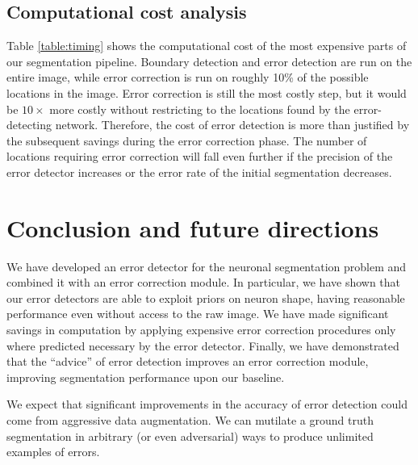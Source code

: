 \documentclass{article}
\begin{document}
\subsection{Computational cost analysis}
Table \ref{table:timing} shows the computational cost of the most expensive
parts of our segmentation pipeline. Boundary detection and error detection are
run on the entire image, while error correction is run on roughly 10\% of the
possible locations in the image.  Error correction is still the most costly
step, but it would be $10\times$ more costly without restricting to the
locations found by the error-detecting network. Therefore, the cost of error
detection is more than justified by the subsequent savings during the error
correction phase.  The number of locations requiring error correction will fall
even further if the precision of the error detector increases or the error rate
of the initial segmentation decreases.


\section{Conclusion and future directions}
We have developed an error detector for the neuronal segmentation problem and
combined it with an error correction module. In particular, we have shown that
our error detectors are able to exploit priors on neuron shape, having
reasonable performance even without access to the raw image. We have made
significant savings in computation by applying expensive error correction
procedures only where predicted necessary by the error detector. Finally, we
have demonstrated that the ``advice'' of error detection improves an error
correction module, improving segmentation performance upon our baseline.

We expect that significant improvements in the accuracy of error detection could
come from aggressive data augmentation. We can mutilate a ground truth
segmentation in arbitrary (or even adversarial) ways to produce unlimited
examples of errors.
\end{document}
